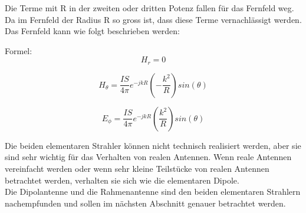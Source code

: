 Die Terme mit R in der zweiten oder dritten Potenz fallen für das Fernfeld weg. Da im Fernfeld der Radius R so gross ist, dass diese Terme vernachlässigt werden. 
Das Fernfeld kann wie folgt beschrieben werden:


Formel:
\begin{equation}
H_r= 0
\end{equation}

\begin{equation}
H_\theta= \frac{I S}{4\pi}   e^{-jkR} \left(- \frac{k^{2}}{R}   \right) sin(\theta)
\end{equation}

\begin{equation}
E_\phi= \frac{I S}{4\pi}   e^{-jkR} \left( \frac{k^{2}}{R}   \right) sin(\theta)
\end{equation}

Die beiden elementaren Strahler können nicht technisch  realisiert werden, aber sie sind sehr wichtig für das Verhalten von realen Antennen. Wenn reale Antennen vereinfacht werden oder wenn sehr kleine Teilstücke von realen Antennen betrachtet werden,  verhalten sie sich  wie die elementaren Dipole. \\

Die Dipolantenne und die Rahmenantenne sind den beiden elementaren Strahlern nachempfunden und sollen im nächsten Abschnitt genauer betrachtet werden.


